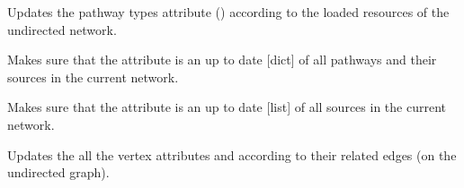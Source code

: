 \documentclass[letterpaper,10pt,english]{sphinxmanual}
\begin{document}
\begin{fulllineitems}
\begin{fulllineitems}
\end{fulllineitems}


\begin{fulllineitems}
\label{\detokenize{main:pypath.main.PyPath.update_db_dict}}
\end{fulllineitems}


\begin{fulllineitems}
\label{\detokenize{main:pypath.main.PyPath.update_pathway_types}}
Updates the pathway types attribute
() according to the
loaded resources of the undirected network.

\end{fulllineitems}


\begin{fulllineitems}
\label{\detokenize{main:pypath.main.PyPath.update_pathways}}
Makes sure that the 
attribute is an up to date {[}dict{]} of all pathways and their
sources in the current network.

\end{fulllineitems}


\begin{fulllineitems}
\label{\detokenize{main:pypath.main.PyPath.update_sources}}
Makes sure that the 
attribute is an up to date {[}list{]} of all sources in the current
network.

\end{fulllineitems}


\begin{fulllineitems}
\label{\detokenize{main:pypath.main.PyPath.update_vertex_sources}}
Updates the all the vertex attributes  and
 according to their related edges (on the
undirected graph).


\end{fulllineitems}
\end{fulllineitems}
\end{document}
